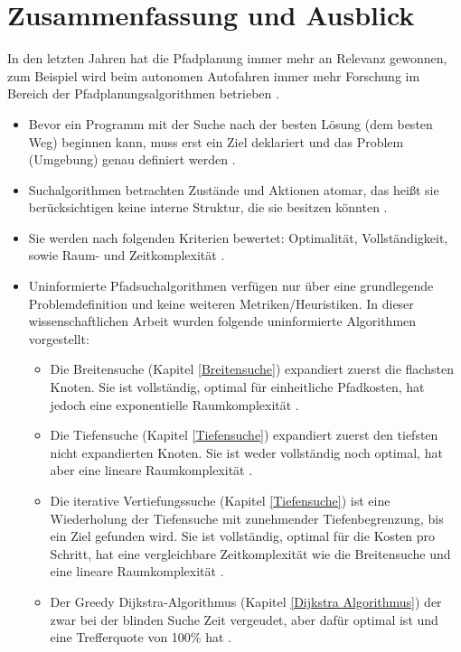 \chapter{Zusammenfassung und Ausblick}
\label{Zusammenfassung und Ausblick}
In den letzten Jahren hat die Pfadplanung immer mehr an Relevanz gewonnen, zum Beispiel wird beim autonomen Autofahren immer mehr Forschung 
im Bereich der Pfadplanungsalgorithmen betrieben \cite{Karur:21}.
\noindent \\
\begin{itemize}
    \item Bevor ein Programm mit der Suche nach der besten Lösung (dem besten Weg) beginnen kann, muss erst ein Ziel deklariert und das Problem (Umgebung) genau definiert werden \cite[108,109]{Russell:10}.
    \item Suchalgorithmen betrachten Zustände und Aktionen atomar, das heißt sie berücksichtigen keine interne Struktur, die sie besitzen könnten \cite[108,109]{Russell:10}.
    \item Sie werden nach folgenden Kriterien bewertet: Optimalität, Vollständigkeit, sowie Raum- und Zeitkomplexität \cite[80]{Russell:10}.
    \item Uninformierte Pfadsuchalgorithmen verfügen nur über eine grundlegende Problemdefinition und keine weiteren Metriken/Heuristiken. In dieser wissenschaftlichen Arbeit wurden folgende uninformierte Algorithmen vorgestellt:
    \begin{itemize}
        \item Die Breitensuche (Kapitel \ref{Breitensuche}) expandiert zuerst die flachsten Knoten. Sie ist vollständig, optimal für einheitliche Pfadkosten, hat jedoch eine exponentielle Raumkomplexität \cite[81]{Russell:10}.
        \item Die Tiefensuche (Kapitel \ref{Tiefensuche}) expandiert zuerst den tiefsten nicht expandierten Knoten. Sie ist weder vollständig noch optimal, hat aber eine lineare Raumkomplexität \cite[85,86]{Russell:10}.
        \item Die iterative Vertiefungssuche (Kapitel \ref{Tiefensuche}) ist eine Wiederholung der Tiefensuche mit zunehmender Tiefenbegrenzung, bis ein Ziel gefunden wird. Sie ist vollständig, optimal für die Kosten pro Schritt, hat eine vergleichbare Zeitkomplexität wie die Breitensuche und eine lineare Raumkomplexität \cite[85,86]{Russell:10}.
        \item Der Greedy Dijkstra-Algorithmus (Kapitel \ref{Dijkstra Algorithmus}) der zwar bei der blinden Suche Zeit vergeudet, aber dafür optimal ist und eine Trefferquote von 100\% hat \cite{Karur:21}.

\end{itemize}
\end{itemize}

